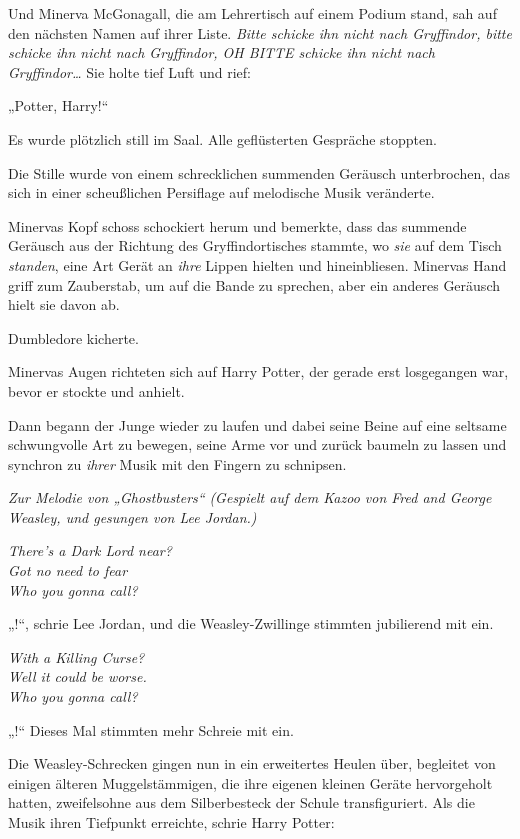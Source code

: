 Und Minerva McGonagall, die am Lehrertisch auf einem Podium stand, sah auf den nächsten Namen auf ihrer Liste. \emph{Bitte schicke ihn nicht nach Gryffindor, bitte schicke ihn nicht nach Gryffindor, OH BITTE schicke ihn nicht nach Gryffindor…} Sie holte tief Luft und rief:

„Potter, Harry!“

Es wurde plötzlich still im Saal. Alle geflüsterten Gespräche stoppten.

Die Stille wurde von einem schrecklichen summenden Geräusch unterbrochen, das sich in einer scheußlichen Persiflage auf melodische Musik veränderte.

Minervas Kopf schoss schockiert herum und bemerkte, dass das summende Geräusch aus der Richtung des Gryffindortisches stammte, wo \emph{sie} auf dem Tisch \emph{standen}, eine Art Gerät an \emph{ihre} Lippen hielten und hineinbliesen. Minervas Hand griff zum Zauberstab, um  auf die Bande zu sprechen, aber ein anderes Geräusch hielt sie davon ab.

Dumbledore kicherte.

Minervas Augen richteten sich auf Harry Potter, der gerade erst losgegangen war, bevor er stockte und anhielt.

Dann begann der Junge wieder zu laufen und dabei seine Beine auf eine seltsame schwungvolle Art zu bewegen, seine Arme vor und zurück baumeln zu lassen und synchron zu \emph{ihrer} Musik mit den Fingern zu schnipsen.

\begin{center}
\emph{Zur Melodie von „Ghostbusters“}
\emph{(Gespielt auf dem Kazoo von Fred and George Weasley,
und gesungen von Lee Jordan.)}

\emph{There’s a Dark Lord near?\\
Got no need to fear\\
Who you gonna call?}
\end{center}

„!“, schrie Lee Jordan, und die Weasley-Zwillinge stimmten jubilierend mit ein.

\begin{center}
\emph{With a Killing Curse?\\
Well it could be worse.\\
Who you gonna call?}
\end{center}

„!“ Dieses Mal stimmten mehr Schreie mit ein.

Die Weasley-Schrecken gingen nun in ein erweitertes Heulen über, begleitet von einigen älteren Muggelstämmigen, die ihre eigenen kleinen Geräte hervorgeholt hatten, zweifelsohne aus dem Silberbesteck der Schule transfiguriert. Als die Musik ihren Tiefpunkt erreichte, schrie Harry Potter:

